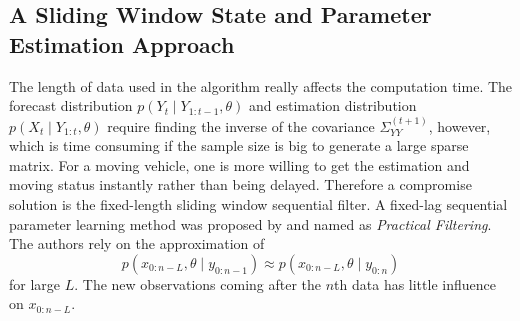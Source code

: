 %

\subsection{A Sliding Window State and Parameter Estimation Approach}

The length of data used in the algorithm really affects the computation time. The forecast distribution $p(Y_{t}\mid Y_{1:t-1},\theta)$ and estimation distribution $p(X_{t}\mid Y_{1:t},\theta)$ require finding the inverse of the covariance $\Sigma_{YY}^{(t+1)}$, however, which is time consuming if the sample size is big to generate a large sparse matrix. For a moving vehicle, one is more willing to get the estimation and moving status instantly rather than being delayed. Therefore a compromise solution is the fixed-length sliding window sequential filter. A fixed-lag sequential parameter learning method was proposed by \cite{polson2008practical} and named as \textit{Practical Filtering}. The authors rely on the approximation of 
\begin{equation*}
p(x_{0:n-L},\theta\mid y_{0:n-1}) \approx p(x_{0:n-L},\theta \mid y_{0:n})
\end{equation*}
for large $L$. The new observations coming after the $n$th data has little influence on $x_{0:n-L}$. 

